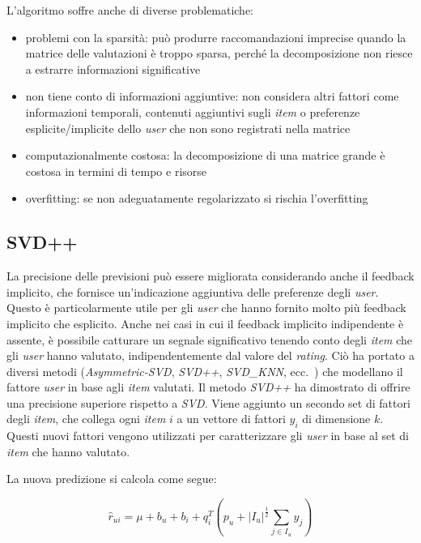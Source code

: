 L'algoritmo soffre anche di diverse problematiche:

\begin{itemize}
    \item problemi con la sparsità: può produrre raccomandazioni imprecise quando la matrice delle valutazioni è troppo sparsa, perché la decomposizione non riesce a estrarre informazioni significative
    \item non tiene conto di informazioni aggiuntive: non considera altri fattori come informazioni temporali, contenuti aggiuntivi sugli \textit{item} o preferenze esplicite/implicite dello \textit{user} che non sono registrati nella matrice
    \item computazionalmente costosa: la decomposizione di una matrice grande è costosa in termini di tempo e risorse
    \item overfitting: se non adeguatamente regolarizzato si rischia l'overfitting
\end{itemize}

\subsection{SVD++}\label{svdpp}

La precisione delle previsioni può essere migliorata considerando anche il feedback implicito, che fornisce un'indicazione aggiuntiva delle preferenze degli \textit{user}. Questo è particolarmente utile per gli \textit{user} che hanno fornito molto più feedback implicito che esplicito. Anche nei casi in cui il feedback implicito indipendente è assente, è possibile catturare un segnale significativo tenendo conto degli \textit{item} che gli \textit{user} hanno valutato, indipendentemente dal valore del \textit{rating}. Ciò ha portato a diversi metodi (\textit{Asymmetric-SVD}, \textit{SVD++}, \textit{SVD\_KNN}, ecc.~\cite{SVD++, SVD_KNN}) che modellano il fattore \textit{user} in base agli \textit{item} valutati. Il metodo \textit{SVD++} ha dimostrato di offrire una precisione superiore rispetto a \textit{SVD}. Viene aggiunto un secondo set di fattori degli \textit{item}, che collega ogni \textit{item} $i$ a un vettore di fattori $y_i$ di dimensione $k$. Questi nuovi fattori vengono utilizzati per caratterizzare gli \textit{user} in base al set di \textit{item} che hanno valutato. 

La nuova predizione si calcola come segue:

\[
\hat{r}_{ui} = \mu + b_u + b_i + q_i^T \left(p_u + |I_u|^{\frac{1}{2}} \sum\limits_{j \in I_u} y_j \right)
\]

